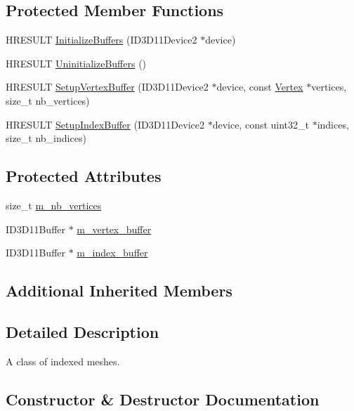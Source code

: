 \subsection*{Protected Member Functions}
\begin{DoxyCompactItemize}
\item 
H\+R\+E\+S\+U\+LT \hyperlink{classmage_1_1_indexed_mesh_a6fb81a1e8f17452de954d836bd2fbbae}{Initialize\+Buffers} (I\+D3\+D11\+Device2 $\ast$device)
\item 
H\+R\+E\+S\+U\+LT \hyperlink{classmage_1_1_indexed_mesh_a7188698b2a8104adce23264fa9d9659c}{Uninitialize\+Buffers} ()
\item 
H\+R\+E\+S\+U\+LT \hyperlink{classmage_1_1_indexed_mesh_a5a6107080bbdba1288ffee59cb7523f0}{Setup\+Vertex\+Buffer} (I\+D3\+D11\+Device2 $\ast$device, const \hyperlink{structmage_1_1_vertex}{Vertex} $\ast$vertices, size\+\_\+t nb\+\_\+vertices)
\item 
H\+R\+E\+S\+U\+LT \hyperlink{classmage_1_1_indexed_mesh_af7768d4fed6cbd54b92704a5e3598b78}{Setup\+Index\+Buffer} (I\+D3\+D11\+Device2 $\ast$device, const uint32\+\_\+t $\ast$indices, size\+\_\+t nb\+\_\+indices)
\end{DoxyCompactItemize}
\subsection*{Protected Attributes}
\begin{DoxyCompactItemize}
\item 
size\+\_\+t \hyperlink{classmage_1_1_indexed_mesh_aa97d660f00cdec3c99b50ea636d49709}{m\+\_\+nb\+\_\+vertices}
\item 
I\+D3\+D11\+Buffer $\ast$ \hyperlink{classmage_1_1_indexed_mesh_aad5756b6a52727c2db924c67c753e7c8}{m\+\_\+vertex\+\_\+buffer}
\item 
I\+D3\+D11\+Buffer $\ast$ \hyperlink{classmage_1_1_indexed_mesh_a21178389091c3619291145c2d306b473}{m\+\_\+index\+\_\+buffer}
\end{DoxyCompactItemize}
\subsection*{Additional Inherited Members}


\subsection{Detailed Description}
A class of indexed meshes. 

\subsection{Constructor \& Destructor Documentation}
\hypertarget{classmage_1_1_indexed_mesh_a2004ef3fd446e796cb908bfdd7e97896}{}\label{classmage_1_1_indexed_mesh_a2004ef3fd446e796cb908bfdd7e97896} 
